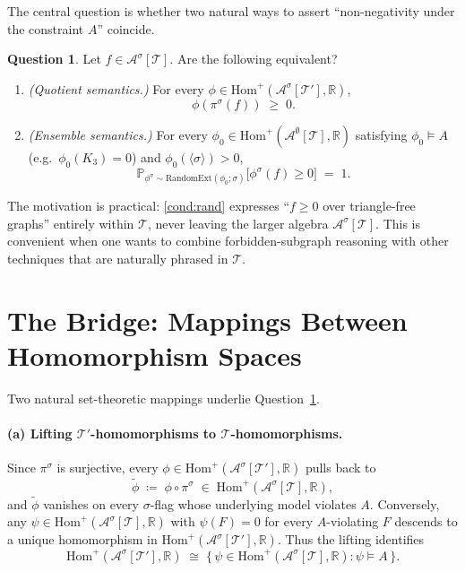 \documentclass[11pt]{article}
\theoremstyle{definition}
\newtheorem{question}[theorem]{Question}
\newcommand{\R}{\mathbb{R}}
\newcommand{\Prob}{\mathbb{P}}
\newcommand{\A}{\mathcal{A}}
\newcommand{\T}{\mathcal{T}}
\newcommand{\Homp}{\mathrm{Hom}^{+}}
\newcommand{\RandomExt}{\mathrm{RandomExt}}
\begin{document}
\medskip

The central question is whether two natural ways to assert ``non-negativity
under the constraint $A$'' coincide.

\begin{question}\label{q:main}
Let $f \in \A^{\sigma}[\T]$. Are the following equivalent?
\begin{enumerate}[label=\textup{(\arabic*)}, leftmargin=2.5em]
  \item\label{cond:quot}
        \emph{(Quotient semantics.)} For every
        $\phi \in \Homp(\A^{\sigma}[\T'], \R)$,
        \[ \phi(\pi^{\sigma}(f)) \;\geq\; 0. \]
  \item\label{cond:rand}
        \emph{(Ensemble semantics.)} For every
        $\phi_0 \in \Homp(\A^{\emptyset}[\T], \R)$ satisfying $\phi_0 \models A$
        (e.g.\ $\phi_0(K_3) = 0$) and $\phi_0(\langle \sigma \rangle) > 0$,
        \[
          \Prob_{\phi^{\sigma} \sim \RandomExt(\phi_0; \sigma)}
          \bigl[\phi^{\sigma}(f) \geq 0 \bigr] \;=\; 1.
        \]
\end{enumerate}
\end{question}

The motivation is practical: \ref{cond:rand} expresses ``$f \geq 0$ over
triangle-free graphs'' entirely within $\T$, never leaving the larger algebra
$\A^{\sigma}[\T]$. This is convenient when one wants to combine
forbidden-subgraph reasoning with other techniques that are naturally phrased
in $\T$.

\section{The Bridge: Mappings Between Homomorphism Spaces}\label{sec:bridge}

Two natural set-theoretic mappings underlie Question~\ref{q:main}.

\paragraph{(a) Lifting $\T'$-homomorphisms to $\T$-homomorphisms.}
Since $\pi^{\sigma}$ is surjective, every
$\phi \in \Homp(\A^{\sigma}[\T'], \R)$ pulls back to
\[
  \widetilde{\phi} \;\coloneqq\; \phi \circ \pi^{\sigma}
  \;\in\; \Homp(\A^{\sigma}[\T], \R),
\]
and $\widetilde{\phi}$ vanishes on every $\sigma$-flag whose underlying model
violates $A$. Conversely, any $\psi \in \Homp(\A^{\sigma}[\T], \R)$ with
$\psi(F) = 0$ for every $A$-violating $F$ descends to a unique homomorphism in
$\Homp(\A^{\sigma}[\T'], \R)$. Thus the lifting identifies
\[
  \Homp(\A^{\sigma}[\T'], \R)
  \;\cong\;
  \bigl\{\,\psi \in \Homp(\A^{\sigma}[\T], \R) : \psi \models A \,\bigr\}.
\]
\end{document}
